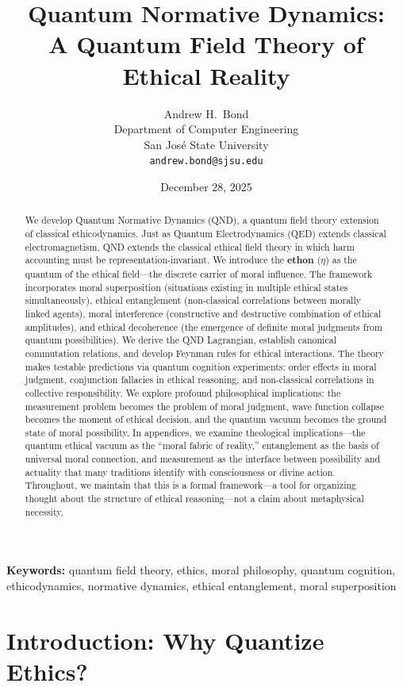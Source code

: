 \documentclass[12pt]{article}
\title{Quantum Normative Dynamics:\\A Quantum Field Theory of Ethical Reality}
\author{Andrew H.\ Bond\\
Department of Computer Engineering\\
San Jos\'{e} State University\\
\texttt{andrew.bond@sjsu.edu}}
\date{December 28, 2025}
\begin{document}
\maketitle

\noindent\textbf{Keywords:} quantum field theory, ethics, moral philosophy, quantum cognition, ethicodynamics, normative dynamics, ethical entanglement, moral superposition

\begin{abstract}
We develop Quantum Normative Dynamics (QND), a quantum field theory extension of classical ethicodynamics. Just as Quantum Electrodynamics (QED) extends classical electromagnetism, QND extends the classical ethical field theory in which harm accounting must be representation-invariant. We introduce the \textbf{ethon} ($\eta$) as the quantum of the ethical field---the discrete carrier of moral influence. The framework incorporates moral superposition (situations existing in multiple ethical states simultaneously), ethical entanglement (non-classical correlations between morally linked agents), moral interference (constructive and destructive combination of ethical amplitudes), and ethical decoherence (the emergence of definite moral judgments from quantum possibilities). We derive the QND Lagrangian, establish canonical commutation relations, and develop Feynman rules for ethical interactions. The theory makes testable predictions via quantum cognition experiments: order effects in moral judgment, conjunction fallacies in ethical reasoning, and non-classical correlations in collective responsibility. We explore profound philosophical implications: the measurement problem becomes the problem of moral judgment, wave function collapse becomes the moment of ethical decision, and the quantum vacuum becomes the ground state of moral possibility. In appendices, we examine theological implications---the quantum ethical vacuum as the ``moral fabric of reality,'' entanglement as the basis of universal moral connection, and measurement as the interface between possibility and actuality that many traditions identify with consciousness or divine action. Throughout, we maintain that this is a formal framework---a tool for organizing thought about the structure of ethical reasoning---not a claim about metaphysical necessity.
\end{abstract}

\tableofcontents

\newpage

\section{Introduction: Why Quantize Ethics?}
\end{document}
